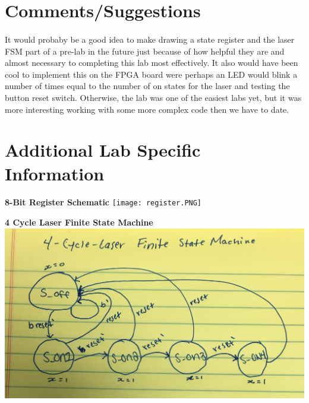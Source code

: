 \documentclass[12pt]{report}
\begin{document}
\section*{Comments/Suggestions}
	\paragraph{}
	It would probaby be a good idea to make drawing a state register and the laser FSM part of a pre-lab in the future just because of how helpful they are and almost
	necessary to completing this lab most effectively.  It also would have been cool to implement this on the FPGA board were perhaps an LED would blink a number of
	times equal to the number of on states for the laser and testing the button reset switch.  Otherwise, the lab was one of the easiest labs yet, but it was more interesting
	working with some more complex code then we have to date.	

\vspace{8cm}
\section*{Additional Lab Specific Information}
	\paragraph{}
	\begin{center}
		\textbf{8-Bit Register Schematic}
		\texttt{[image: register.PNG]}
	\end{center}

	\begin{center}
		\textbf{4 Cycle Laser Finite State Machine}
		\includegraphics[scale=.17]{laser.PNG}
	\end{center}
\end{document}
